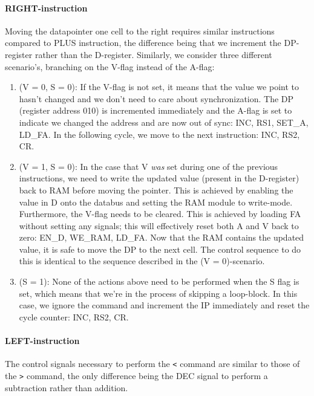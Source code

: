 \paragraph{RIGHT-instruction} Moving the datapointer one cell to the right requires similar instructions compared to PLUS instruction, the difference being that we increment the DP-register rather than the D-register. Similarly, we consider three different scenario's, branching on the V-flag instead of the A-flag:
%
\begin{enumerate}
\item (V = 0, S = 0): If the V-flag is not set, it means that the value we point to hasn't changed and we don't need to care about synchronization. The DP (register address 010) is incremented immediately and the A-flag is set to indicate we changed the address and are now out of sync: INC, RS1, SET\_A, LD\_FA. In the following cycle, we move to the next instruction: INC, RS2, CR.
\item (V = 1, S = 0): In the case that V \emph{was} set during one of the previous instructions, we need to write the updated value (present in the D-register) back to RAM before moving the pointer. This is achieved by enabling the value in D onto the databus and setting the RAM module to write-mode. Furthermore, the V-flag needs to be cleared. This is achieved by loading FA without setting any signals; this will effectively reset both A and V back to zero: EN\_D, WE\_RAM, LD\_FA. Now that the RAM contains the updated value, it is safe to move the DP to the next cell. The control sequence to do this is identical to the sequence described in the (V = 0)-scenario.
\item (S = 1): None of the actions above need to be performed when the S flag is set, which means that we're in the process of skipping a loop-block. In this case, we ignore the command and increment the IP immediately and reset the cycle counter: INC, RS2, CR.
\end{enumerate}

\paragraph{LEFT-instruction} The control signals necessary to perform the \texttt{<} command are similar to those of the \texttt{>} command, the only difference being the DEC signal to perform a subtraction rather than addition.


